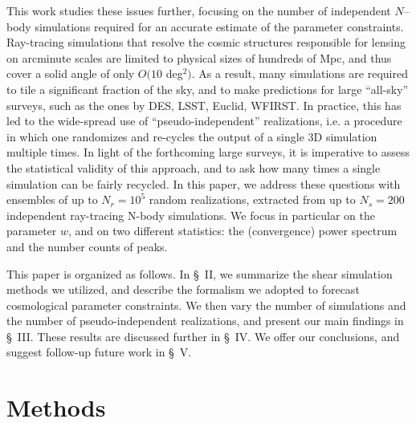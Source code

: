 \documentclass[reprint,aps,prd,superscriptaddress,showkeys,showpacs]{revtex4-1}
\begin{document}
This work studies these issues further, focusing on the number of
independent $N$--body simulations required for an accurate estimate of
the parameter constraints.  Ray-tracing simulations that resolve the
cosmic structures responsible for lensing on arcminute scales are
limited to physical sizes of hundreds of Mpc, and thus cover a solid
angle of only $O(10$ deg$^2)$.  As a result, many simulations are
required to tile a significant fraction of the sky, and to make
predictions for large ``all-sky'' surveys, such as the ones by DES,
LSST, Euclid, WFIRST.  In practice, this has led to the wide-spread
use of ``pseudo-independent'' realizations, i.e. a procedure in which
one randomizes and re-cycles the output of a single 3D simulation
multiple times.
In light of the forthcoming large surveys, it is imperative to assess
the statistical validity of this approach, and to ask how many times a
single simulation can be fairly recycled.  In this paper, we address
these questions with ensembles of up to $N_r=10^5$ random
realizations, extracted from up to $N_s=200$ independent ray-tracing
N-body simulations. We focus in particular on the parameter $w$, and
on two different statistics: the (convergence) power spectrum and
the number counts of peaks.


This paper is organized as follows.  In \S~II, we summarize the shear
simulation methods we utilized, and describe the formalism we adopted
to forecast cosmological parameter constraints. We then vary the
number of simulations and the number of pseudo-independent
realizations, and present our main findings in \S~III. These results
are discussed further in \S~IV.  We offer our conclusions, and suggest
follow-up future work in \S~V.


\section{Methods}
\end{document}
